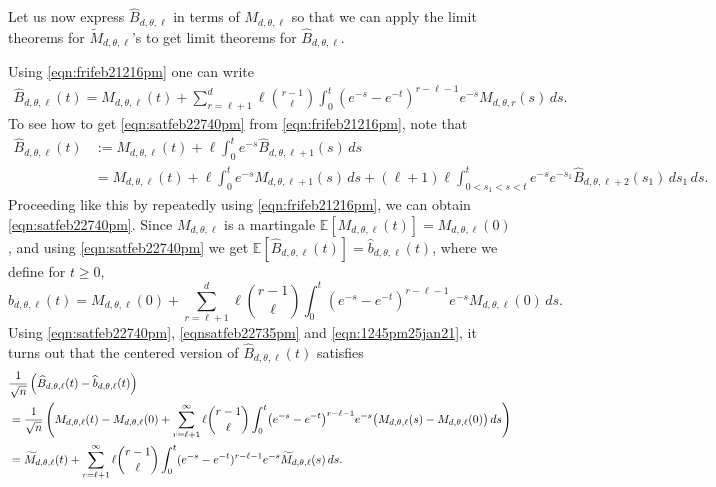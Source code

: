 \documentclass[11pt]{article}
\begin{document}
Let us now express $\widehat{B}_{d,\theta,\ell}$ in terms of ${M}_{d,\theta,\ell}$ so that we can apply the limit theorems for $\widetilde{M}_{d,\theta,\ell}$'s to get limit theorems for $\widehat{B}_{d,\theta,\ell}$. 


Using \eqref{eqn:frifeb21216pm} one can write 
\begin{align}\label{eqn:satfeb22740pm}
\widehat{B}_{d,\theta,\ell}(t) = M_{d,\theta,\ell}(t)+\sum_{r=\ell+1}^{d} \ell {r-1\choose \ell}\int_{0}^t(e^{-s}-e^{-t})^{r-\ell-1}e^{-s} M_{d, \theta,r}(s) \, ds.
\end{align}
To see how to get \eqref{eqn:satfeb22740pm} from \eqref{eqn:frifeb21216pm}, note that 
\begin{equation*}
\begin{aligned}
   \widehat{B}_{d,\theta,\ell}(t) &:=  M_{d,\theta,\ell}(t) + \ell\int_{0}^t e^{-s}\widehat{B}_{d,\theta,\ell+1}(s) \, ds \\
    &= M_{d,\theta,\ell}(t) + \ell\int_{0}^t e^{-s} M_{d,\theta,\ell+1}(s) \, ds + (\ell+1)\ell\int_{0<s_1<s<t}^t e^{-s} e^{-s_1}\widehat{B}_{d,\theta,\ell+2}(s_1) \, ds_1 \, ds.
    \end{aligned}
\end{equation*}
Proceeding like this by repeatedly using \eqref{eqn:frifeb21216pm}, we can obtain \eqref{eqn:satfeb22740pm}.
Since $M_{d,\theta,\ell}$ is a martingale $\mathbb{E}[M_{d,\theta,\ell}(t)]= M_{d,\theta,\ell}(0)$, and using \eqref{eqn:satfeb22740pm} we get $ \mathbb{E}[\widehat{B}_{d,\theta,\ell}(t)]=\widehat{b}_{d,\theta,\ell}(t)$, where we define for $t\geq 0$,
\begin{equation}\label{eqnsatfeb22735pm}
\widehat{b}_{d,\theta,\ell}(t) = M_{d,\theta,\ell}(0)+\sum_{r=\ell+1}^{d}\ell{r-1\choose \ell }\int_{0}^t(e^{-s}-e^{-t})^{r-\ell-1}e^{-s} M_{d,\theta, \ell}(0) \, ds.
\end{equation}
Using \eqref{eqn:satfeb22740pm}, \eqref{eqnsatfeb22735pm} and \eqref{eqn:1245pm25jan21}, it turns out that the centered version of $\widehat{B}_{d,\theta, \ell}(t)$ satisfies 
\begin{align*}%
&\frac{1}{\sqrt{n}}\left(\widehat{B}_{d,\theta,\ell}(t) - \widehat{b}_{d,\theta,\ell}(t)\right) \notag \\
&= \frac{1}{\sqrt{n}} \left({M}_{d,\theta,\ell}(t)-{M}_{d,\theta,\ell}(0)+\sum_{r=\ell+1}^{\infty}\ell{r-1\choose \ell }\int_{0}^t\bigl(e^{-s}-e^{-t}\bigr)^{r-\ell-1}e^{-s} \bigl({M}_{d,\theta,\ell}(s)-M_{d,\theta,\ell}(0)\bigr) \, ds \right)\notag\\
 &   = \widetilde{M}_{d,\theta,\ell}(t)
    +\sum_{r=\ell+1}^{\infty}\ell{r-1\choose \ell}\int_{0}^t(e^{-s}-e^{-t})^{r-\ell-1}e^{-s} \widetilde{M}_{d, \theta, \ell}(s) \, ds. 
\end{align*}
\end{document}
